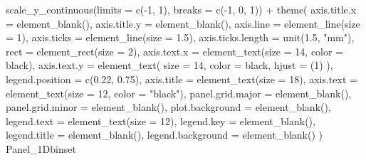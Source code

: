 \documentclass[
]{krantz}
\makeatletter
\newenvironment{Shaded}{\begin{snugshade}}{\end{snugshade}}
\newcommand{\AttributeTok}[1]{\textcolor[rgb]{0.77,0.63,0.00}{#1}}
\newcommand{\DecValTok}[1]{\textcolor[rgb]{0.00,0.00,0.81}{#1}}
\newcommand{\FloatTok}[1]{\textcolor[rgb]{0.00,0.00,0.81}{#1}}
\newcommand{\FunctionTok}[1]{\textcolor[rgb]{0.00,0.00,0.00}{#1}}
\newcommand{\NormalTok}[1]{#1}
\newcommand{\SpecialCharTok}[1]{\textcolor[rgb]{0.00,0.00,0.00}{#1}}
\newcommand{\StringTok}[1]{\textcolor[rgb]{0.31,0.60,0.02}{#1}}
\newenvironment{kframe}{%
\medskip{}
\setlength{\fboxsep}{.8em}
 \def\at@end@of@kframe{}%
 \ifinner\ifhmode%
  \def\at@end@of@kframe{\end{minipage}}%
  \begin{minipage}{\columnwidth}%
 \fi\fi%
 \def\FrameCommand##1{\hskip\@totalleftmargin \hskip-\fboxsep
 \colorbox{shadecolor}{##1}\hskip-\fboxsep
     \hskip-\linewidth \hskip-\@totalleftmargin \hskip\columnwidth}%
 \MakeFramed {\advance\hsize-\width
   \@totalleftmargin\z@ \linewidth\hsize
   \@setminipage}}%
 {\par\unskip\endMakeFramed%
 \at@end@of@kframe}
\renewenvironment{Shaded}{\begin{kframe}}{\end{kframe}}
\makeatother
\begin{document}
\begin{Shaded}
\begin{Highlighting}[]
  \FunctionTok{scale\_y\_continuous}\NormalTok{(}\AttributeTok{limits =} \FunctionTok{c}\NormalTok{(}\SpecialCharTok{{-}}\DecValTok{1}\NormalTok{, }\DecValTok{1}\NormalTok{), }\AttributeTok{breaks =} \FunctionTok{c}\NormalTok{(}\SpecialCharTok{{-}}\DecValTok{1}\NormalTok{, }\DecValTok{0}\NormalTok{, }\DecValTok{1}\NormalTok{)) }\SpecialCharTok{+}
  \FunctionTok{theme}\NormalTok{(}
    \AttributeTok{axis.title.x =} \FunctionTok{element\_blank}\NormalTok{(),}
    \AttributeTok{axis.title.y =} \FunctionTok{element\_blank}\NormalTok{(),}
    \AttributeTok{axis.line =} \FunctionTok{element\_line}\NormalTok{(}\AttributeTok{size =} \DecValTok{1}\NormalTok{),}
    \AttributeTok{axis.ticks =} \FunctionTok{element\_line}\NormalTok{(}\AttributeTok{size =} \FloatTok{1.5}\NormalTok{),}
    \AttributeTok{axis.ticks.length =} \FunctionTok{unit}\NormalTok{(}\FloatTok{1.5}\NormalTok{, }\StringTok{"mm"}\NormalTok{),}
    \AttributeTok{rect =} \FunctionTok{element\_rect}\NormalTok{(}\AttributeTok{size =} \DecValTok{2}\NormalTok{),}
    \AttributeTok{axis.text.x =} \FunctionTok{element\_text}\NormalTok{(}\AttributeTok{size =} \DecValTok{14}\NormalTok{, }\AttributeTok{color =} \StringTok{\textquotesingle{}black\textquotesingle{}}\NormalTok{),}
    \AttributeTok{axis.text.y =}
      \FunctionTok{element\_text}\NormalTok{(}
        \AttributeTok{size =} \DecValTok{14}\NormalTok{,}
        \AttributeTok{color =} \StringTok{\textquotesingle{}black\textquotesingle{}}\NormalTok{,}
        \AttributeTok{hjust =}\NormalTok{ (}\DecValTok{1}\NormalTok{)}
\NormalTok{      ),}
    \AttributeTok{legend.position =} \FunctionTok{c}\NormalTok{(}\FloatTok{0.22}\NormalTok{, }\FloatTok{0.75}\NormalTok{),}
    \AttributeTok{axis.title =} \FunctionTok{element\_text}\NormalTok{(}\AttributeTok{size =} \DecValTok{18}\NormalTok{),}
    \AttributeTok{axis.text =} \FunctionTok{element\_text}\NormalTok{(}\AttributeTok{size =} \DecValTok{12}\NormalTok{, }\AttributeTok{color =} \StringTok{"black"}\NormalTok{),}
    \AttributeTok{panel.grid.major =} \FunctionTok{element\_blank}\NormalTok{(),}
    \AttributeTok{panel.grid.minor =} \FunctionTok{element\_blank}\NormalTok{(),}
    \AttributeTok{plot.background =} \FunctionTok{element\_blank}\NormalTok{(),}
    \AttributeTok{legend.text =} \FunctionTok{element\_text}\NormalTok{(}\AttributeTok{size =} \DecValTok{12}\NormalTok{),}
    \AttributeTok{legend.key =} \FunctionTok{element\_blank}\NormalTok{(),}
    \AttributeTok{legend.title =} \FunctionTok{element\_blank}\NormalTok{(),}
    \AttributeTok{legend.background =} \FunctionTok{element\_blank}\NormalTok{()}
\NormalTok{  )}
\NormalTok{Panel\_1Dbinset}
\end{Highlighting}
\end{Shaded}
\end{document}
